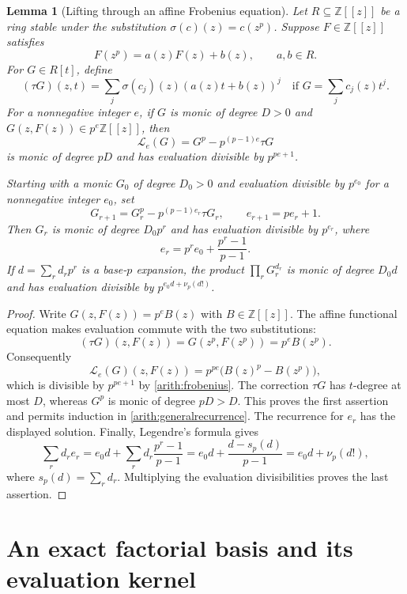 \documentclass[11pt,a4paper]{article}
\newtheorem{lemma}{Lemma}[section]
\theoremstyle{definition}
\theoremstyle{remark}\newtheorem{remark}[lemma]{Remark}
\begin{document}
\begin{lemma}[Lifting through an affine Frobenius equation]
\label{arith:lift}
Let $R\subseteq\mathbb Z[[z]]$ be a ring stable under the substitution
$\sigma(c)(z)=c(z^p)$. Suppose $F\in\mathbb Z[[z]]$ satisfies
\[
 F(z^p)=a(z)F(z)+b(z),\qquad a,b\in R.
\]
For $G\in R[t]$, define
\[
 (\tau G)(z,t)=\sum_j \sigma(c_j)(z)(a(z)t+b(z))^j
 \quad\text{if }G=\sum_jc_j(z)t^j.
\]
For a nonnegative integer $e$, if $G$ is monic of degree $D>0$ and
$G(z,F(z))\in p^e\mathbb Z[[z]]$, then
\begin{equation}\label{arith:liftoperator}
 \mathcal L_e(G)=G^p-p^{(p-1)e}\tau G
\end{equation}
is monic of degree $pD$ and has evaluation divisible by $p^{pe+1}$.

Starting with a monic $G_0$ of degree $D_0>0$ and evaluation divisible
by $p^{e_0}$ for a nonnegative integer $e_0$, set
\begin{equation}\label{arith:generalrecurrence}
 G_{r+1}=G_r^p-p^{(p-1)e_r}\tau G_r,
 \qquad e_{r+1}=pe_r+1.
\end{equation}
Then $G_r$ is monic of degree $D_0p^r$ and has evaluation divisible by
$p^{e_r}$, where
\[
 e_r=p^re_0+\frac{p^r-1}{p-1}.
\]
If $d=\sum_r d_rp^r$ is a base-$p$ expansion, the product
$\prod_rG_r^{d_r}$ is monic of degree $D_0d$ and has evaluation divisible
by $p^{e_0d+\nu_p(d!)}$.
\end{lemma}
\begin{proof}
Write $G(z,F(z))=p^eB(z)$ with $B\in\mathbb Z[[z]]$. The affine functional
equation makes evaluation commute with the two substitutions:
\[
 (\tau G)(z,F(z))=G(z^p,F(z^p))=p^eB(z^p).
\]
Consequently
\[
 \mathcal L_e(G)(z,F(z))
   =p^{pe}\bigl(B(z)^p-B(z^p)\bigr),
\]
which is divisible by $p^{pe+1}$ by \eqref{arith:frobenius}.
The correction $\tau G$ has $t$-degree at most $D$, whereas $G^p$ is
monic of degree $pD>D$. This proves the first assertion and permits
induction in \eqref{arith:generalrecurrence}.
The recurrence for $e_r$ has the displayed solution. Finally, Legendre's
formula gives
\[
 \sum_r d_re_r=e_0d+\sum_r d_r\frac{p^r-1}{p-1}
       =e_0d+\frac{d-s_p(d)}{p-1}=e_0d+\nu_p(d!),
\]
where $s_p(d)=\sum_rd_r$. Multiplying the evaluation divisibilities
proves the last assertion.
\end{proof}

\section{An exact factorial basis and its evaluation kernel}
\end{document}
